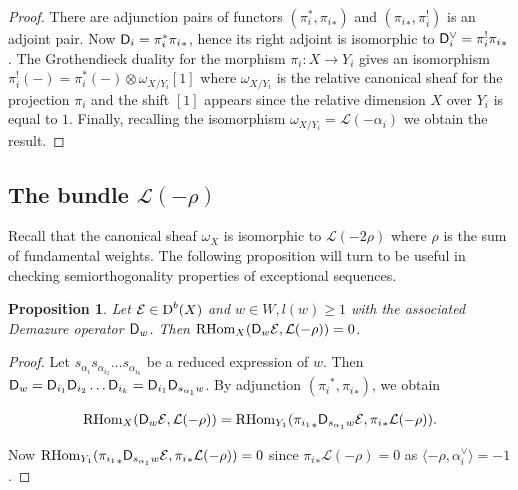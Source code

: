 \documentclass[sn-mathphys-num]{sn-jnl}%
\newcommand{\Ee}{\mathcal E}
\newcommand{\Ll}{\mathcal L}
\newcommand*{\Dd}{\mathop{\mathrm D\kern0pt}\nolimits}
\newcommand*{\RHom}{\mathop{\mathrm {RHom}}\nolimits}
\newcommand{\sd}{\sf D}
\newtheorem{proposition}[theorem]{Proposition}
\theoremstyle{definition}
\begin{document}
\begin{proof}
There are adjunction pairs of functors $({\pi _i^{\ast}},{\pi _i}_{\ast})$ and $({\pi _i}_{\ast},{\pi _i^!})$ is an adjoint pair. Now ${\sd }_i={\pi _i^{\ast}}{\pi _i}_{\ast}$, hence its right adjoint is isomorphic to ${\sd }_i^{\vee}={\pi _i^!}{\pi _i}_{\ast}$. The Grothendieck duality for the morphism $\pi _i:X\rightarrow Y_i$ gives an isomorphism ${\pi _i^!}(-)={\pi _i^{\ast}}(-)\otimes \omega _{X/Y_i}[1]$ where $\omega _{X/Y_i}$ is the relative canonical sheaf for the projection $\pi _i$ and the shift $[1]$ appears since the relative dimension $X$ over $Y_i$ is equal to $1$. Finally, recalling the isomorphism $\omega _{X/Y_i}=\Ll (-\alpha _i)$ we obtain the result.
\end{proof}

\subsection{The bundle $\Ll (-\rho)$} 

Recall that the canonical sheaf $\omega _X$ is isomorphic to $\Ll (-2\rho)$ where $\rho$ is the sum of fundamental weights. The following proposition will turn to be useful in checking semiorthogonality properties of exceptional sequences.

\begin{proposition}\label{prop:Demazure_-rho-orthogonal}
Let $\Ee \in \Dd ^b(X)$ and $w\in W, l(w)\geq 1$ with the associated Demazure operator ${\sd }_w$. Then $\RHom _X({\sd}_w\Ee,\Ll (-\rho))=0$.
\end{proposition}

\begin{proof}
Let $s_{\alpha _i}s_{\alpha _{i_2}}\dots s_{\alpha _{i_k}}$ be a reduced expression of $w$. Then ${\sd }_w={\sd }_{i_1}{\sd }_{i_2}\dots {\sd }_{i_k}={\sd}_{i_1}{\sd}_{s_{\alpha _1}w}$. By adjunction $({\pi _i}^{\ast},{\pi _i}_{\ast})$, we obtain

\begin{equation}
\RHom _X({\sd}_w\Ee,\Ll (-\rho))=\RHom _{Y_1}({\pi _{i_1}}_{\ast}{\sd}_{s_{\alpha _1}w}\Ee,{\pi _i}_{\ast}\Ll (-\rho)).
\end{equation}

Now $\RHom _{Y_1}({\pi _{i_1}}_{\ast}{\sd}_{s_{\alpha _1}w}\Ee,{\pi _i}_{\ast}\Ll (-\rho))=0$  since ${\pi _i}_{\ast}\Ll (-\rho)=0$ as $\langle -\rho,\alpha _i^{\vee}\rangle =-1$.
\end{proof}
\end{document}
